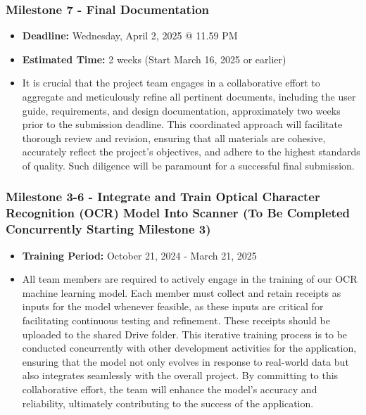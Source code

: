 \documentclass{article}
\begin{document}
\subsubsection*{Milestone 7 - Final Documentation}
\begin{itemize}
    \item \textbf{Deadline:} Wednesday, April 2, 2025 @ 11.59 PM
    \item \textbf{Estimated Time:} 2 weeks (Start March 16, 2025 or earlier)
    \item It is crucial that the project team engages in a collaborative effort
    to aggregate and meticulously refine all pertinent documents, including the
    user guide, requirements, and design documentation, approximately two weeks
    prior to the submission deadline. This coordinated approach will facilitate
    thorough review and revision, ensuring that all materials are cohesive,
    accurately reflect the project’s objectives, and adhere to the highest
    standards of quality. Such diligence will be paramount for a successful
    final submission.
\end{itemize}

\newpage

\subsubsection*{Milestone 3-6 - Integrate and Train Optical Character Recognition (OCR) Model Into Scanner (To Be Completed Concurrently Starting Milestone 3)}
\begin{itemize}
    \item \textbf{Training Period:} October 21, 2024 - March 21, 2025
    \item All team members are required to actively engage in the training of
    our OCR machine learning model. Each member must collect and retain receipts
    as inputs for the model whenever feasible, as these inputs are critical for
    facilitating continuous testing and refinement. These receipts should be
    uploaded to the shared Drive folder. This iterative training process is to
    be conducted concurrently with other development activities for the
    application, ensuring that the model not only evolves in response to
    real-world data but also integrates seamlessly with the overall project. By
    committing to this collaborative effort, the team will enhance the model’s
    accuracy and reliability, ultimately contributing to the success of the
    application.
\end{itemize}
\end{document}

